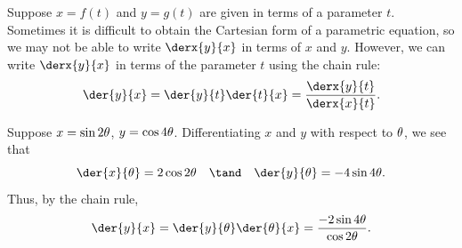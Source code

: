 Suppose $x = f(t)$ and $y = g(t)$ are given in terms of a parameter $t$. Sometimes it is difficult to obtain the Cartesian form of a parametric equation, so we may not be able to write $\derx{y}{x}$ in terms of $x$ and $y$. However, we can write $\derx{y}{x}$ in terms of the parameter $t$ using the chain rule: \[\der{y}{x} = \der{y}{t} \der{t}{x} = \frac{\derx{y}{t}}{\derx{x}{t}}.\]

\begin{example}
    Suppose $x = \sin 2\theta$, $y = \cos 4\theta$. Differentiating $x$ and $y$ with respect to $\theta$, we see that \[\der{x}{\t} = 2\cos 2\t \quad \tand \quad \der{y}{\t} = -4\sin 4\t.\] Thus, by the chain rule, \[\der{y}{x} = \der{y}{\t} \der{\t}{x} = \frac{-2 \sin 4\t}{\cos 2\t}.\]
\end{example}